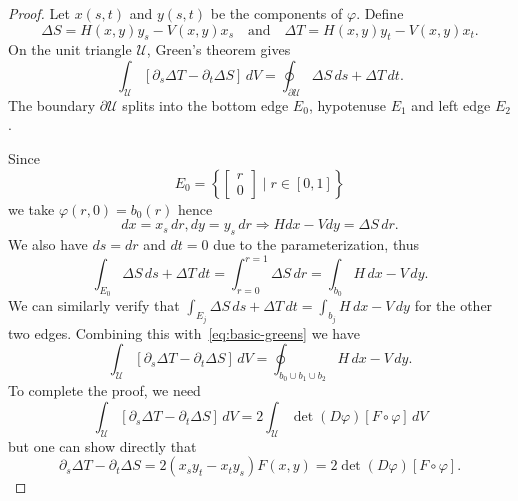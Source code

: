 \documentclass[letterpaper,10pt]{article}
\theoremstyle{definition}
\newcommand{\utri}{\mathcal{U}}
\begin{document}
\begin{proof}
Let \(x(s, t)\) and \(y(s, t)\) be the components of \(\varphi\). Define
\begin{equation}
\Delta S = H(x, y) y_s - V(x, y) x_s \quad \text{and} \quad
\Delta T = H(x, y) y_t - V(x, y) x_t.
\end{equation}
On the unit triangle \(\utri\), Green's theorem gives
\begin{equation}\label{eq:basic-greens}
\int_{\mathcal{U}} \left[\partial_s \Delta T -
  \partial_t \Delta S\right] \, dV =
\oint_{\partial \mathcal{U}} \Delta S \, ds + \Delta T \, dt.
\end{equation}
The boundary \(\partial \utri\) splits into the bottom edge \(E_0\),
hypotenuse \(E_1\) and left edge \(E_2\).

Since
\begin{equation}
E_0 = \left\{ \left[ \begin{array}{c} r \\ 0 \end{array}\right] \mid
  r \in \left[0, 1\right] \right\}
\end{equation}
we take \(\varphi(r, 0) = b_0(r)\) hence
\begin{equation}
dx = x_s \, dr, dy = y_s \, dr \Longrightarrow
H dx - V dy = \Delta S \, dr.
\end{equation}
We also have \(ds = dr\) and \(dt = 0\) due to the
parameterization, thus
\begin{equation}
\int_{E_0} \Delta S \, ds + \Delta T \, dt =
  \int_{r = 0}^{r = 1} \Delta S \, dr = \int_{b_0} H \, dx - V \, dy.
\end{equation}
We can similarly verify that
\(\int_{E_j} \Delta S \, ds + \Delta T \, dt = \int_{b_j} H \, dx - V \, dy\)
for the other two edges. Combining this with~\eqref{eq:basic-greens}
we have
\begin{equation}
\int_{\mathcal{U}} \left[\partial_s \Delta T -
  \partial_t \Delta S\right] \, dV =
\oint_{b_0 \cup b_1 \cup b_2} H \, dx - V \, dy.
\end{equation}
To complete the proof, we need
\begin{equation}
\int_{\mathcal{U}} \left[\partial_s \Delta T -
  \partial_t \Delta S\right] \, dV =
2 \int_{\mathcal{U}} \det(D\varphi) \left[F \circ \varphi\right] \, dV
\end{equation}
but one can show directly that
\begin{equation}
\partial_s \Delta T - \partial_t \Delta S =
  2 \left(x_s y_t - x_t y_s\right) F(x, y) =
  2 \det(D\varphi) \left[F \circ \varphi\right]. \tag*{\qedhere}
\end{equation}
\end{proof}
\end{document}
